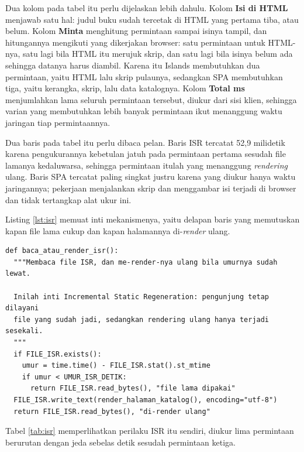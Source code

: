 Dua kolom pada tabel itu perlu dijelaskan lebih dahulu. Kolom \textbf{Isi
di HTML} menjawab satu hal: judul buku sudah tercetak di HTML yang pertama
tiba, atau belum. Kolom \textbf{Minta} menghitung permintaan sampai isinya
tampil, dan hitungannya mengikuti yang dikerjakan browser: satu permintaan
untuk HTML-nya, satu lagi bila HTML itu merujuk skrip, dan satu lagi bila
isinya belum ada sehingga datanya harus diambil. Karena itu Islands
membutuhkan dua permintaan, yaitu HTML lalu skrip pulaunya, sedangkan SPA
membutuhkan tiga, yaitu kerangka, skrip, lalu data katalognya. Kolom
\textbf{Total ms} menjumlahkan lama seluruh permintaan tersebut, diukur dari
sisi klien, sehingga varian yang membutuhkan lebih banyak permintaan ikut
menanggung waktu jaringan tiap permintaannya.

Dua baris pada tabel itu perlu dibaca pelan. Baris ISR tercatat 52,9
milidetik karena pengukurannya kebetulan jatuh pada permintaan pertama
sesudah file lamanya kedaluwarsa, sehingga permintaan itulah yang menanggung
\textit{rendering} ulang. Baris SPA tercatat paling singkat justru karena yang diukur
hanya waktu jaringannya; pekerjaan menjalankan skrip dan menggambar isi
terjadi di browser dan tidak tertangkap alat ukur ini.

Listing \ref{lst:isr} memuat inti mekanismenya, yaitu delapan baris yang
memutuskan kapan file lama cukup dan kapan halamannya di-\textit{render} ulang.

\begin{lstlisting}[style=PythonStyle, caption={Inti Incremental Static Regeneration, tersedia di \berkas{sources/chapter08/aplikasi.py}}, label={lst:isr}]
def baca_atau_render_isr():
  """Membaca file ISR, dan me-render-nya ulang bila umurnya sudah lewat.

  Inilah inti Incremental Static Regeneration: pengunjung tetap dilayani
  file yang sudah jadi, sedangkan rendering ulang hanya terjadi sesekali.
  """
  if FILE_ISR.exists():
    umur = time.time() - FILE_ISR.stat().st_mtime
    if umur < UMUR_ISR_DETIK:
      return FILE_ISR.read_bytes(), "file lama dipakai"
  FILE_ISR.write_text(render_halaman_katalog(), encoding="utf-8")
  return FILE_ISR.read_bytes(), "di-render ulang"
\end{lstlisting}

Tabel \ref{tab:isr} memperlihatkan perilaku ISR itu sendiri, diukur lima
permintaan berurutan dengan jeda sebelas detik sesudah permintaan ketiga.

